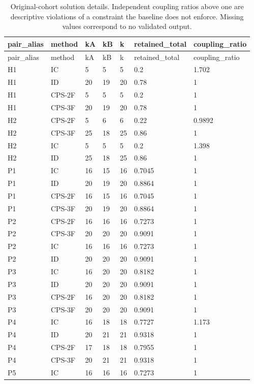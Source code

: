 \begingroup
\small
\begin{longtable}{lllllll}
\caption{Original-cohort solution details. Independent coupling ratios above one are descriptive violations of a constraint the baseline does not enforce. Missing values correspond to no validated output.}\label{tab:quality}\\
\toprule
pair\_alias & method & kA & kB & k & retained\_total & coupling\_ratio \\
\midrule
\endfirsthead
\toprule
pair\_alias & method & kA & kB & k & retained\_total & coupling\_ratio \\
\midrule
\endhead
H1 & IC & 5 & 5 & 5 & 0.2 & 1.702 \\
H1 & ID & 20 & 19 & 20 & 0.78 & 1 \\
H1 & CPS-2F & 5 & 5 & 5 & 0.2 & 1 \\
H1 & CPS-3F & 20 & 19 & 20 & 0.78 & 1 \\
H2 & CPS-2F & 5 & 6 & 6 & 0.22 & 0.9892 \\
H2 & CPS-3F & 25 & 18 & 25 & 0.86 & 1 \\
H2 & IC & 5 & 5 & 5 & 0.2 & 1.398 \\
H2 & ID & 25 & 18 & 25 & 0.86 & 1 \\
P1 & IC & 16 & 15 & 16 & 0.7045 & 1 \\
P1 & ID & 20 & 19 & 20 & 0.8864 & 1 \\
P1 & CPS-2F & 16 & 15 & 16 & 0.7045 & 1 \\
P1 & CPS-3F & 20 & 19 & 20 & 0.8864 & 1 \\
P2 & CPS-2F & 16 & 16 & 16 & 0.7273 & 1 \\
P2 & CPS-3F & 20 & 20 & 20 & 0.9091 & 1 \\
P2 & IC & 16 & 16 & 16 & 0.7273 & 1 \\
P2 & ID & 20 & 20 & 20 & 0.9091 & 1 \\
P3 & IC & 16 & 20 & 20 & 0.8182 & 1 \\
P3 & ID & 20 & 20 & 20 & 0.9091 & 1 \\
P3 & CPS-2F & 16 & 20 & 20 & 0.8182 & 1 \\
P3 & CPS-3F & 20 & 20 & 20 & 0.9091 & 1 \\
P4 & IC & 16 & 18 & 18 & 0.7727 & 1.173 \\
P4 & ID & 20 & 21 & 21 & 0.9318 & 1 \\
P4 & CPS-2F & 17 & 18 & 18 & 0.7955 & 1 \\
P4 & CPS-3F & 20 & 21 & 21 & 0.9318 & 1 \\
P5 & IC & 16 & 16 & 16 & 0.7273 & 1 \\

\end{longtable}
